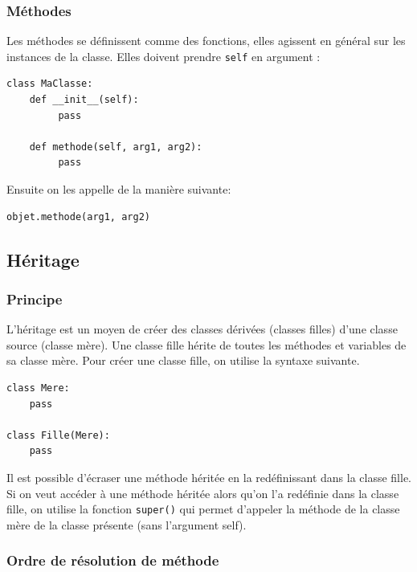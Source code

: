 \documentclass[a4paper, 10pt]{article}
\newcommand{\code}[1]{{\small\texttt{#1}}}
\begin{document}
\subsubsection{Méthodes}
Les méthodes se définissent comme des fonctions, elles agissent en général sur les instances de la classe. Elles doivent prendre \code{self} en argument :
\begin{verbatim}
class MaClasse:
    def __init__(self):
         pass

    def methode(self, arg1, arg2):
         pass
\end{verbatim}

Ensuite on les appelle de la manière suivante:
\begin{verbatim}
objet.methode(arg1, arg2)
\end{verbatim}


\subsection{Héritage}

\subsubsection{Principe}

L'héritage est un moyen de créer des classes dérivées (classes filles) d'une classe source (classe mère). Une classe fille hérite de toutes les méthodes et variables de sa classe mère. Pour créer une classe fille, on utilise la syntaxe suivante.

\begin{verbatim}
class Mere:
    pass

class Fille(Mere):
    pass
\end{verbatim}

Il est possible d'écraser une méthode héritée en la redéfinissant dans la classe fille. Si on veut accéder à une méthode héritée alors qu'on l'a redéfinie dans la classe fille, on utilise la fonction \code{super()} qui permet d'appeler la méthode de la classe mère de la classe présente (sans l'argument self).

\subsubsection{Ordre de résolution de méthode}
\end{document}
